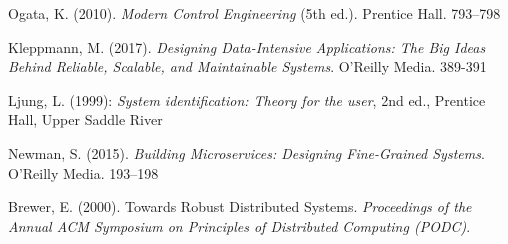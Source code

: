 \noindent Ogata, K. (2010). \emph{Modern Control Engineering} (5th ed.). Prentice Hall. 793--798

\noindent Kleppmann, M. (2017). \emph{Designing Data-Intensive Applications: The Big Ideas Behind Reliable, Scalable, and Maintainable Systems}. O'Reilly Media. 389-391

\noindent Ljung, L. (1999): \emph{System identification: Theory for the user}, 2nd ed., Prentice Hall, Upper Saddle River

\noindent Newman, S. (2015). \emph{Building Microservices: Designing Fine-Grained Systems}. O'Reilly Media. 193--198

\noindent Brewer, E. (2000). Towards Robust Distributed Systems. \emph{Proceedings of the Annual ACM Symposium on Principles of Distributed Computing (PODC)}.
